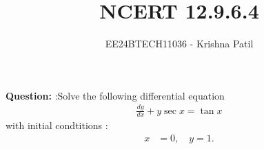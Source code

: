 \documentclass[journal]{IEEEtran}
\begin{document}

\vspace{3cm}

\title{NCERT 12.9.6.4}
\author{EE24BTECH11036 - Krishna Patil}
{\let\newpage\relax\maketitle}

\renewcommand{\thefigure}{\theenumi}
\renewcommand{\thetable}{\theenumi}
\setlength{\intextsep}{10pt} %
\textbf{Question:} :Solve the following differential equation
\begin{align}
	\frac{dy}{dx} + y \sec x = \tan x
\end{align}
with initial condtitions :
\begin{align}
    x &= 0, \quad y = 1.
\end{align}
\solution
\end{document}
